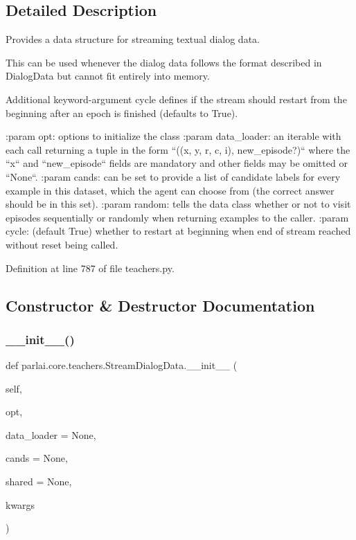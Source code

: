 \subsection{Detailed Description}
\begin{DoxyVerb}Provides a data structure for streaming textual dialog data.

This can be used whenever the dialog data follows the format described in
DialogData but cannot fit entirely into memory.

Additional keyword-argument cycle defines if the stream should restart from
the beginning after an epoch is finished (defaults to True).

:param opt:
    options to initialize the class
:param data_loader:
    an iterable with each call returning a tuple in the form
    ``((x, y, r, c, i), new_episode?)`` where the ``x`` and ``new_episode``
    fields are mandatory and other fields may be omitted or ``None``.
:param cands:
    can be set to provide a list of candidate labels for every example in
    this dataset, which the agent can choose from (the correct answer
    should be in this set).
:param random:
    tells the data class whether or not to visit episodes sequentially or
    randomly when returning examples to the caller.
:param cycle:
    (default True) whether to restart at beginning when end of stream
    reached without reset being called.
\end{DoxyVerb}
 

Definition at line 787 of file teachers.\+py.



\subsection{Constructor \& Destructor Documentation}
\mbox{\label{classparlai_1_1core_1_1teachers_1_1StreamDialogData_a72324ec2775d16b31d1d18287a8f84e9}} 
\subsubsection{\texorpdfstring{\+\_\+\+\_\+init\+\_\+\+\_\+()}{\_\_init\_\_()}}
{\footnotesize\ttfamily def parlai.\+core.\+teachers.\+Stream\+Dialog\+Data.\+\_\+\+\_\+init\+\_\+\+\_\+ (\begin{DoxyParamCaption}\item[{}]{self,  }\item[{}]{opt,  }\item[{}]{data\+\_\+loader = {\ttfamily None},  }\item[{}]{cands = {\ttfamily None},  }\item[{}]{shared = {\ttfamily None},  }\item[{}]{kwargs }\end{DoxyParamCaption})}



